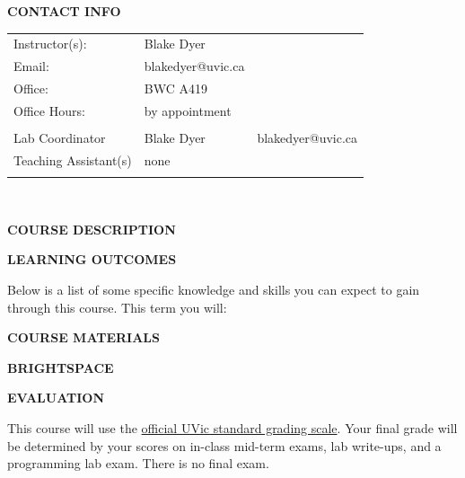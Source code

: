 \documentclass[11pt]{article}
\begin{document}
\textbf{CONTACT INFO}

\begin{center}
  \centering
  \begin{tabular}{ L{.25\linewidth}L{.25\linewidth}L{.25\linewidth} }
    Instructor(s):      & Blake Dyer &  \\
    Email:      & blakedyer@uvic.ca &  \\
    Office:      & BWC A419 &  \\
    Office Hours:      & by appointment &  \\
          &  &  \\
    Lab Coordinator      & Blake Dyer &  blakedyer@uvic.ca\\
Teaching Assistant(s)      & none &  \\
      &  &  \\
  \end{tabular}\\
\end{center}

\begin{center}
\textbf{COURSE DESCRIPTION}
\end{center}





\textbf{LEARNING OUTCOMES}

Below is a list of some specific knowledge and skills you can expect to gain through this course. This term you will:
\begin{itemize}
	\setlength\itemsep{0em}
        {\item \learningoutcome}
\end{itemize}

\textbf{COURSE MATERIALS}



\textbf{BRIGHTSPACE}



\begin{center}
  \textbf{EVALUATION}
\end{center}

This course will use the \href{https://www.uvic.ca/calendar/future/undergrad/index.php#/policy/S1AAgoGuV?bc=true&bcCurrent=14%20-%20Grading&bcGroup=Undergraduate%20Academic%20Regulations&bcItemType=policies}{official UVic standard grading scale}. Your final grade will be determined by your scores on in-class mid-term exams, lab write-ups, and a programming lab exam. There is no final exam.
\end{document}
